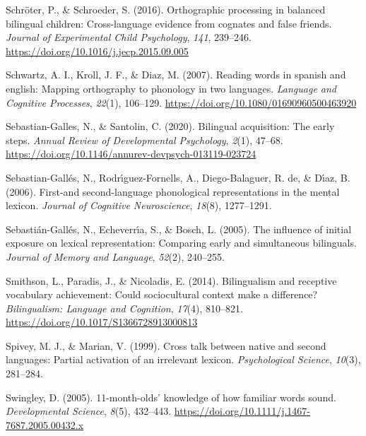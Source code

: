 \documentclass[
]{article}
\newlength{\cslhangindent}
\newlength{\cslentryspacingunit} %
\newenvironment{CSLReferences}[2] %
 {%
  \setlength{\parindent}{0pt}
  \ifodd #1
  \let\oldpar\par
  \def\par{\hangindent=\cslhangindent\oldpar}
  \fi
  \setlength{\parskip}{#2\cslentryspacingunit}
 }%
 {}
\begin{document}
\begin{CSLReferences}{1}{0}
\leavevmode{}%
Schröter, P., \& Schroeder, S. (2016). Orthographic processing in
balanced bilingual children: Cross-language evidence from cognates and
false friends. \emph{Journal of Experimental Child Psychology},
\emph{141}, 239--246. \url{https://doi.org/10.1016/j.jecp.2015.09.005}

\leavevmode{}%
Schwartz, A. I., Kroll, J. F., \& Diaz, M. (2007). Reading words in
spanish and english: Mapping orthography to phonology in two languages.
\emph{Language and Cognitive Processes}, \emph{22}(1), 106--129.
\url{https://doi.org/10.1080/01690960500463920}

\leavevmode{}%
Sebastian-Galles, N., \& Santolin, C. (2020). Bilingual acquisition: The
early steps. \emph{Annual Review of Developmental Psychology},
\emph{2}(1), 47--68.
\url{https://doi.org/10.1146/annurev-devpsych-013119-023724}

\leavevmode{}%
Sebastian-Gallés, N., Rodrı́guez-Fornells, A., Diego-Balaguer, R. de, \&
Dı́az, B. (2006). First-and second-language phonological representations
in the mental lexicon. \emph{Journal of Cognitive Neuroscience},
\emph{18}(8), 1277--1291.

\leavevmode{}%
Sebastián-Gallés, N., Echeverrı́a, S., \& Bosch, L. (2005). The influence
of initial exposure on lexical representation: Comparing early and
simultaneous bilinguals. \emph{Journal of Memory and Language},
\emph{52}(2), 240--255.

\leavevmode{}%
Smithson, L., Paradis, J., \& Nicoladis, E. (2014). Bilingualism and
receptive vocabulary achievement: Could sociocultural context make a
difference? \emph{Bilingualism: Language and Cognition}, \emph{17}(4),
810--821. \url{https://doi.org/10.1017/S1366728913000813}

\leavevmode{}%
Spivey, M. J., \& Marian, V. (1999). Cross talk between native and
second languages: Partial activation of an irrelevant lexicon.
\emph{Psychological Science}, \emph{10}(3), 281--284.

\leavevmode{}%
Swingley, D. (2005). 11-month-olds' knowledge of how familiar words
sound. \emph{Developmental Science}, \emph{8}(5), 432--443.
\url{https://doi.org/10.1111/j.1467-7687.2005.00432.x}


\end{CSLReferences}
\end{document}
